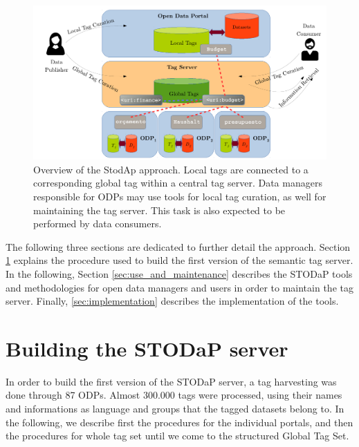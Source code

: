 \begin{figure}[tb]
\begin{center}
\includegraphics[scale=0.65]{images/overview.pdf}
\caption[Overview of the StodAp approach.]{Overview of the StodAp approach. Local tags are connected to a corresponding global tag within a central tag server. 
Data managers responsible for ODPs may use tools for local tag curation, as well for maintaining the tag server. 
This task is also expected to be performed by data consumers.}
\label{fig:overview}
\end{center}
\end{figure}

The following three sections are dedicated to further detail the approach.
Section \ref{sec:stodap_building} explains the procedure used to build the first version of the semantic tag server.
In the following, Section \ref{sec:use_and_maintenance} describes the STODaP tools and methodologies for open data managers and users in order to maintain the tag server.
Finally, \autoref{sec:implementation} describes the implementation of the tools.

\section{Building the STODaP server}
\label{sec:stodap_building}

In order to build the first version of the STODaP server, a tag harvesting was done through 87 ODPs.
Almost 300.000 tags were processed, using their names and informations as language and groups that the tagged datasets belong to.
In the following, we describe first the procedures for the individual portals, and then the procedures for whole tag set until we come to the structured Global Tag Set.

